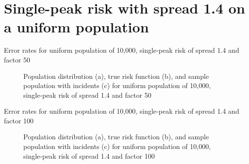  
\section{Single-peak risk with spread 1.4 on a uniform population}
\label{sec:app:results_unif_1.4_1h}

\graphicspath{{./results/unif_50_1.4_1h/}}
\makeatletter
{}
\makeatother

\begin{table}[H]
    
    \caption[]{Error rates for uniform population of 10,000, single-peak risk of \gls{spread} 1.4 and \gls{factor} 50}
    \label{tab:mean_error_rates:unif_50_1.4_1h}
\end{table}

\begin{figure}[H]
    
    \caption[]{Population distribution (a), true risk function (b), and sample population with incidents (c) for uniform population of 10,000, single-peak risk of \gls{spread} 1.4 and \gls{factor} 50}
    \label{fig:distributions:unif_50_1.4_1h}    
\end{figure}


\graphicspath{{./results/unif_100_1.4_1h/}}
\makeatletter
{}
\makeatother

\begin{table}[H]

\caption[]{Error rates for uniform population of 10,000, single-peak risk of \gls{spread} 1.4 and \gls{factor} 100}
\label{tab:mean_error_rates:unif_100_1.4_1h}
\end{table}

\begin{figure}[H]
    
    \caption[]{Population distribution (a), true risk function (b), and sample population with incidents (c) for uniform population of 10,000, single-peak risk of \gls{spread} 1.4 and \gls{factor} 100}
    \label{fig:distributions:unif_100_1.4_1h}    
\end{figure}


\graphicspath{{./results/unif_200_1.4_1h/}}
\makeatletter
{}
\makeatother

